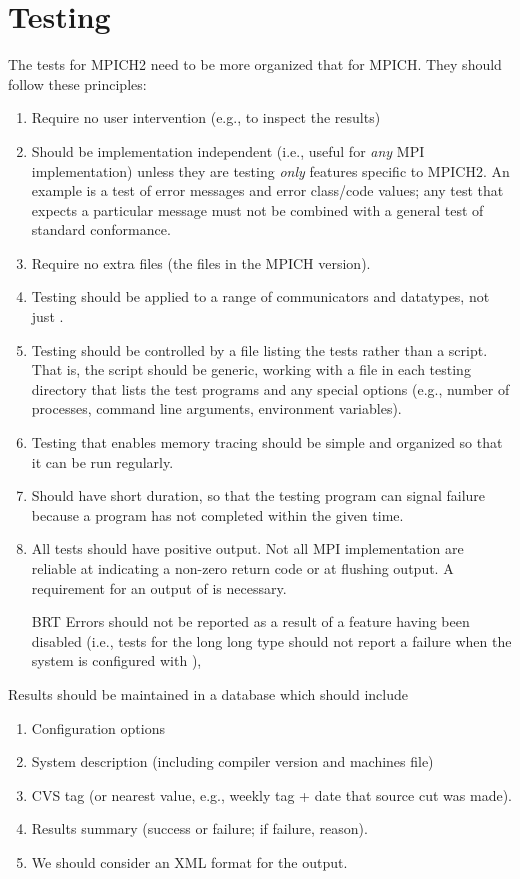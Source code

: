 \documentclass{article}
\begin{document}
\section{Testing}
\label{sec:testing}

The tests for MPICH2 need to be more organized that for MPICH. They
should follow these principles:
\begin{enumerate}
\item Require no user intervention (e.g., to inspect the results)
\item Should be implementation independent (i.e., useful for
\emph{any} MPI implementation) unless they are testing \emph{only}
features specific to MPICH2.  An example is a test of error messages
and error class/code values; any test that expects a particular
message must not be combined with a general test of standard
conformance.
\item Require no extra files (the  files in the MPICH
version).
\item Testing should be applied to a range of communicators and
datatypes, not just .  
\item Testing should be controlled by a file listing the tests rather
than a script.  That is, the script  should be generic,
working with a file in each testing directory that lists the test
programs and any special options (e.g., number of processes, command
line arguments, environment variables).
\item Testing that enables memory tracing should be simple and
organized so that it can be run regularly.
\item Should have short duration, so that the testing program can
signal failure because a program has not completed within the given
time.
\item All tests should have positive output.  Not all MPI
implementation are reliable at indicating a non-zero return code or at
flushing output.  A requirement for an output of  is
necessary. 
\item [BRT] Errors should not be reported as a result of a feature
having been disabled (i.e., tests for the long long type should not
report a failure when the system is configured with
),
\end{enumerate}

Results should be maintained in a database which should include
\begin{enumerate}
\item Configuration options
\item System description (including compiler version and machines file)
\item CVS tag (or nearest value, e.g., weekly tag + date that source
cut was made).
\item Results summary (success or failure; if failure, reason).
\item We should consider an XML format for the output.
\end{enumerate}
\end{document}

